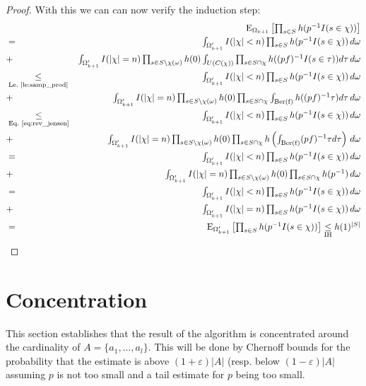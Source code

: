\documentclass{article}
\newcommand{\expectation}{\mathrm{E}}
\newcommand{\eps}{\varepsilon}
\theoremstyle{definition}
\begin{document}
\begin{proof}
With this we can can now verify the induction step:
\begin{eqnarray*}
&  & \textstyle\expectation_{\Omega_{k+1}}\left[\prod_{s \in S} h(p^{-1} I(s \in \chi))\right]  \\
& = & \textstyle \int_{\Omega'_{k+1}} I(|\chi| < n)\prod_{s \in S} h(p^{-1} I(s \in \chi)) \, d \omega \\
& + & \textstyle \int_{\Omega'_{k+1}} I(|\chi| = n) \prod_{s \in S \setminus \chi(\omega)} h(0) \int_{U(C(\chi))} \prod_{s \in S \cap \chi} h((pf)^{-1}I(s \in \tau )) d \tau \, d \omega  \\
& \underset{\textrm{Le.~\ref{le:samp_prod}}}{\leq} & \textstyle \int_{\Omega'_{k+1}} I(|\chi| < n)\prod_{s \in S} h(p^{-1} I(s \in \chi)) \, d \omega \\
& + & \textstyle \int_{\Omega'_{k+1}} I(|\chi| = n) \prod_{s \in S \setminus \chi(\omega)} h(0) \prod_{s \in S \cap \chi} \int_{\mathrm{Ber(f)}} h((pf)^{-1}\tau) d \tau \, d \omega  \\
& \underset{\textrm{Eq.~\ref{eq:rev_jensen}}}{\leq} & \textstyle \int_{\Omega'_{k+1}} I(|\chi| < n)\prod_{s \in S} h(p^{-1} I(s \in \chi)) \, d \omega \\
& + & \textstyle \int_{\Omega'_{k+1}} I(|\chi| = n) \prod_{s \in S \setminus \chi(\omega)} h(0) \prod_{s \in S \cap \chi} h\left(\int_{\mathrm{Ber(f)}} (pf)^{-1}\tau d \tau\right) \, d \omega  \\
& = & \textstyle \int_{\Omega'_{k+1}} I(|\chi| < n)\prod_{s \in S} h(p^{-1} I(s \in \chi)) \, d \omega \\
& + & \textstyle \int_{\Omega'_{k+1}} I(|\chi| = n) \prod_{s \in S \setminus \chi(\omega)} h(0) \prod_{s \in S \cap \chi} h(p^{-1}) \, d \omega  \\
& = & \textstyle \int_{\Omega'_{k+1}} I(|\chi| < n)\prod_{s \in S} h(p^{-1} I(s \in \chi)) \, d \omega \\
& + & \textstyle \int_{\Omega'_{k+1}} I(|\chi| = n) \prod_{s \in S} h(p^{-1} I(s \in \chi)) \, d \omega  \\
& = & \textstyle \expectation_{\Omega'_{k+1}}\left[\prod_{s \in S} h(p^{-1} I(s \in \chi)) \right] \underset{\textrm{IH}}{\leq} h(1)^{|S|}
\end{eqnarray*}

\end{proof}

\section{Concentration}
This section establishes that the result of the algorithm is concentrated around the cardinality of $A = \{ a_1, \ldots, a_l \}$. This will be done by Chernoff bounds for the probability that the estimate is above $(1+\eps)|A|$ (resp. below $(1-\eps)|A|$ assuming $p$ is not too small and a tail estimate for $p$ being too small.
\end{document}
